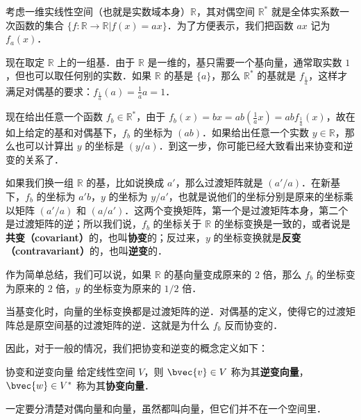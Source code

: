 \begin{example}{}
考虑一维实线性空间（也就是实数域本身）$\mathbb{R}$，其对偶空间 $\mathbb{R}^*$ 就是全体实系数一次函数的集合 $\{f:\mathbb{R}\rightarrow\mathbb{R}|f(x)=ax\}$．为了方便表示，我们把函数 $ax$ 记为 $f_a(x)$．

现在取定 $\mathbb{R}$ 上的一组基．由于 $\mathbb{R}$ 是一维的，基只需要一个基向量，通常取实数 $1$，但也可以取任何别的实数．如果 $\mathbb{R}$ 的基是 $\{a\}$，那么 $\mathbb{R}^*$ 的基就是 $f_{\frac{1}{a}}$，这样才满足对偶基的要求：$f_{\frac{1}{a}}(a)=\frac{1}{a}a=1$．

现在给出任意一个函数 $f_b\in\mathbb{R}^*$，由于 $f_b(x)=bx=ab(\frac{1}{a}x)=abf_{\frac{1}{a}}(x)$，故在如上给定的基和对偶基下，$f_b$ 的坐标为 $(ab)$．如果给出任意一个实数 $y\in\mathbb{R}$，那么也可以计算出 $y$ 的坐标是 $(y/a)$．到这一步，你可能已经大致看出来协变和逆变的关系了．

如果我们换一组 $\mathbb{R}$ 的基，比如说换成 $a'$，那么过渡矩阵就是 $(a'/a)$．在新基下，$f_b$ 的坐标为 $a'b$，$y$ 的坐标为 $y/a'$，也就是说他们的坐标分别是原来的坐标乘以矩阵 $(a'/a)$ 和 $(a/a')$．这两个变换矩阵，第一个是过渡矩阵本身，第二个是过渡矩阵的逆；所以我们说，$f_b$ 的坐标关于 $\mathbb{R}$ 的坐标变换是一致的，或者说是\textbf{共变（covariant）}的，也叫\textbf{协变}的；反过来，$y$ 的坐标变换就是\textbf{反变（contravariant）}的，也叫\textbf{逆变}的．

作为简单总结，我们可以说，如果 $\mathbb{R}$ 的基向量变成原来的 $2$ 倍，那么 $f_b$ 的坐标变为原来的 $2$ 倍，$y$ 的坐标变为原来的 $1/2$ 倍．
\end{example}

当基变化时，向量的坐标变换都是过渡矩阵的逆．对偶基的定义，使得它的过渡矩阵总是原空间基的过渡矩阵的逆．这就是为什么 $f_b$ 反而协变的．

因此，对于一般的情况，我们把协变和逆变的概念定义如下：

\begin{definition}{协变和逆变向量}
给定线性空间 $V$，则 $\bvec{v}\in V$ 称为其\textbf{逆变向量}，$\bvec{w}\in V^*$ 称为其\textbf{协变向量}．
\end{definition}

一定要分清楚对偶向量和向量，虽然都叫向量，但它们并不在一个空间里．


